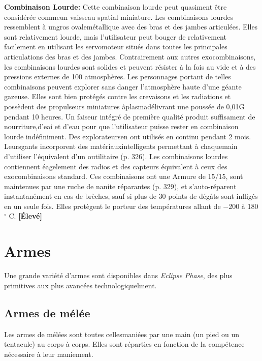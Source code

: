 \textbf{Combinaison Lourde:} Cette combinaison lourde peut quasiment être considérée commeun vaisseau spatial miniature. Les combinaisons lourdes ressemblent à ungros ovalemétallique avec des bras et des jambes articulées. Elles sont relativement lourde, mais l'utilisateur peut bouger de relativement facilement en utilisant les servomoteur situés dans toutes les principales articulations des bras et des jambes. Contrairement aux autres exocombinaisons, les combinaisons lourdes sont solides et peuvent résister à la fois au vide et à des pressions externes de 100 atmosphères. Les personnages portant de telles combinaisons peuvent explorer sans danger l'atmosphère haute d'une géante gazeuse. Elles sont bien protégés contre les crevaisons et les radiations et possèdent des propulseurs miniatures àplasmadélivrant une poussée de 0,01G pendant 10 heures. Un faiseur intégré de première qualité produit suffisament de nourriture,d'eai et d'eau pour que l'utilisateur puisse rester en combinaison lourde indéfiniment. Des explorateursen ont utilisés en continu pendant 2 mois. Leursgants incorporent des matériauxintelligents permettant à chaquemain d'utiliser l'équivalent d'un outilitaire (p. 326). Les combinaisons lourdes contiennent éagelement des radios et des capteurs équivalent à ceux des exocombinaisons standard. Ces combinaisons ont une Armure de 15/15, sont maintenues par une ruche de nanite réparantes (p. 329), et s'auto-réparent instantanément en cas de brèches, sauf si plus de 30 points de dégâts sont infligés en un seule fois. Elles protègent le porteur des températures allant de $-$200 à 180$^{\circ}$ C. \textbf{[Élevé]} 



\section{Armes} \label{sec:weapons} 

Une grande variété d'armes sont disponibles dans \emph{Eclipse Phase}, des plus primitives aux plus avancées technologiquelment. 



\subsection{Armes de mélée} \label{sec:melee-weapons} 

Les armes de mélées sont toutes cellesmaniées par une main (un pied ou un tentacule) au corps à corps. Elles sont réparties en fonction de la compétence nécessaire à leur maniement. 

